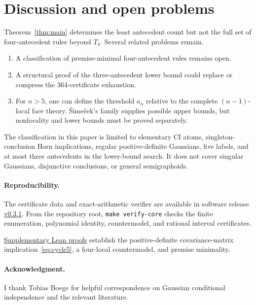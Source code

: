 \documentclass[10pt]{article}
\theoremstyle{definition}
\newcommand{\Tfour}{T_4}
\newcommand{\code}[1]{\texttt{#1}}
\begin{document}
\section{Discussion and open problems}\label{sec:discussion}

Theorem~\ref{thm:main} determines the least antecedent count but not the full set of four-antecedent rules beyond $\Tfour$.  Several related problems remain.
\begin{enumerate}
 \item A classification of premise-minimal four-antecedent rules remains open.
 \item A structural proof of the three-antecedent lower bound could replace or compress the 364-certificate exhaustion.
 \item For $n>5$, one can define the threshold \(a_n\) relative to the complete $(n-1)$-local face theory.  \v{S}ime\v{c}ek's family supplies possible upper bounds, but nonlocality and lower bounds must be proved separately.
\end{enumerate}

The classification in this paper is limited to elementary CI atoms, singleton-conclusion Horn implications, regular positive-definite Gaussians, five labels, and at most three antecedents in the lower-bound search.  It does not cover singular Gaussians, disjunctive conclusions, or general semigraphoids.

\paragraph{Reproducibility.}
The certificate data and exact-arithmetic verifier are available in software release \href{https://github.com/Maar10Herr/Gaussian-CI-a5-Equals-4-Public/tree/v0.3.1}{v0.3.1}.  From the repository root, \code{make verify-core} checks the finite enumeration, polynomial identity, countermodel, and rational interval certificates.

\href{https://github.com/Maar10Herr/Gaussian-CI-a5-Equals-4-Public/tree/af3848c44caabbdba891dab7efbdf9c7ee81d4c0/formalization}{Supplementary Lean proofs} establish the positive-definite covariance-matrix implication~\eqref{eq:cycle5}, a four-local countermodel, and premise minimality.

\paragraph{Acknowledgment.}
I thank Tobias Boege for helpful correspondence on Gaussian conditional independence and the relevant literature.
\end{document}
